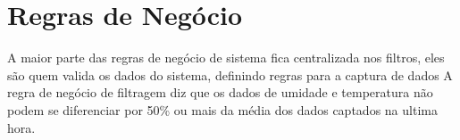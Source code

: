 \section{Regras de Negócio}


A maior parte das regras de negócio de sistema fica centralizada nos filtros, eles são quem valida os dados do sistema, definindo regras para a captura de dados
A regra de negócio de filtragem diz que os dados de umidade e temperatura não podem se diferenciar por 50\% ou mais da média dos dados captados na ultima hora.

